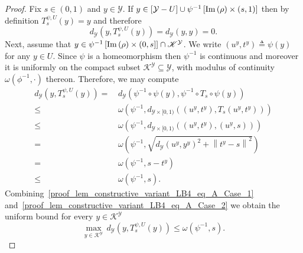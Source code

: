 \documentclass[anon,12pt]{colt2021} %
\newcommand{\yyy}{\mathcal{Y}}
\newcommand{\kkk}{{\mathscr{K}}}
\begin{document}
\begin{proof}
Fix $s \in (0,1)$ and $y \in \yyy$.  If $y \in [\yyy - U] \cup \psi^{-1}\left[
\im{\rho} \times (s,1)
\right]$ then by definition $T_s^{\psi,U}(y)=y$ and therefore
\begin{equation}
    d_{\yyy}\left(
    y
        ,
    T_s^{\psi,U}(y)
    \right)
        =
    d_{\yyy}\left(
    y
        ,
    y
    \right)
    =0.
    \label{proof_lem_constructive_variant_LB4_eq_A_Case_1}
\end{equation}
Next, assume that $y \in \psi^{-1}\left[
\im{\rho} \times (0,s]
\right]\cap \kkk^{\yyy}$.  We write $(u^y,t^y)\triangleq\psi(y)$ for any $y \in U$.  Since $\psi$ is a homeomorphism then $\psi^{-1}$ is continuous and moreover it is uniformly on the compact subset $\kkk^{\yyy}\subseteq \yyy$, with modulus of continuity $\omega(\phi^{-1},\cdot)$ thereon.  Therefore, we may compute
\begin{equation}
    \begin{aligned}
    d_{\yyy}\left(
    y
        ,
    T_s^{\psi,U}(y)
    \right)
        = \, &
    d_{\yyy}\left(
    \psi^{-1}\circ \psi(y)
        ,
    \psi^{-1}\circ T_s\circ \psi(y)
    \right)\\
    \leq\, &
    \omega\left(
    \psi^{-1}
    ,
    d_{\yyy\times [0,1)}\left(
    (u^y,t^y),
    T_s(u^y,t^y)
    \right)
    \right)\\
    \leq &
    \omega\left(
    \psi^{-1}
    ,
    d_{\yyy\times [0,1)}\left(
    (u^y,t^y),
    (u^y,s)
    \right)
    \right)
    \\
    = \,& 
    \omega\left(
    \psi^{-1}
    ,
    \sqrt{d_{\yyy}\left(u^y,y^y\right)^2 + \left\|t^y-s \right\|^2}
    \right)\\
    = \,& 
    \omega\left(
    \psi^{-1}
    ,
    s-t^y
    \right)
    \\
    \leq \,& 
    \omega\left(
    \psi^{-1}
    ,
    s
    \right)
    .
    \end{aligned}
    \label{proof_lem_constructive_variant_LB4_eq_A_Case_2}
\end{equation}
Combining~\eqref{proof_lem_constructive_variant_LB4_eq_A_Case_1} and~\eqref{proof_lem_constructive_variant_LB4_eq_A_Case_2} we obtain the uniform bound for every $y \in \kkk^{\yyy}$
\begin{equation}
    \max_{y \in \kkk^{\yyy}}\, d_{\yyy}\left(
    y
        ,
    T_s^{\psi,U}(y)
    \right)
    \leq  
    \omega\left(
    \psi^{-1}
    ,
    s
    \right)
    .
    \label{proof_lem_constructive_variant_LB4_eq_A_Joint_Cases}

\end{equation}
\end{proof}
\end{document}
